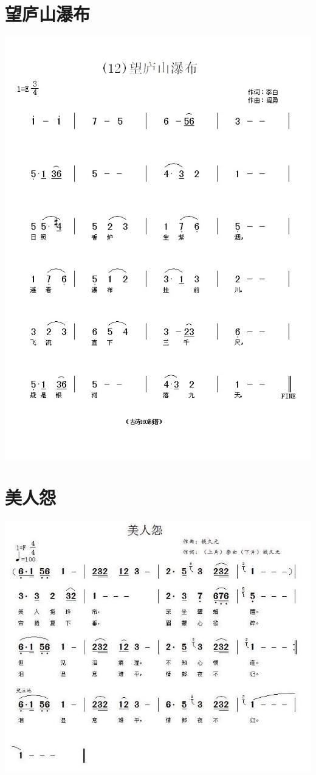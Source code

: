 \documentclass[cn,pad,twocol]{elegantbook}
\begin{document}
\section{望庐山瀑布}
    \includegraphics[width=\textwidth]{dongxiao/20200808-望庐山瀑布-李白.jpg}
\section{美人怨}
    \includegraphics[width=\textwidth]{dongxiao/20200808-美人怨-李白.jpg}
\end{document}
